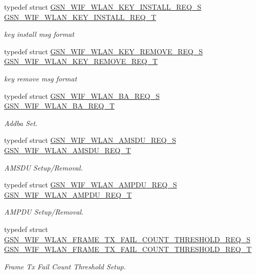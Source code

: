 \begin{DoxyCompactItemize}
typedef struct \hyperlink{a00386}{GSN\_\-WIF\_\-WLAN\_\-KEY\_\-INSTALL\_\-REQ\_\-S} \hyperlink{a00677_gaf02b17f4ae1181f48eafc5cafc75a98b}{GSN\_\-WIF\_\-WLAN\_\-KEY\_\-INSTALL\_\-REQ\_\-T}
\begin{DoxyCompactList}\small\item\em key install msg format \end{DoxyCompactList}\item 
typedef struct \hyperlink{a00387}{GSN\_\-WIF\_\-WLAN\_\-KEY\_\-REMOVE\_\-REQ\_\-S} \hyperlink{a00677_gab7781e4db5d81b8372ab59ea540b6f04}{GSN\_\-WIF\_\-WLAN\_\-KEY\_\-REMOVE\_\-REQ\_\-T}
\begin{DoxyCompactList}\small\item\em key remove msg format \end{DoxyCompactList}\item 
typedef struct \hyperlink{a00370}{GSN\_\-WIF\_\-WLAN\_\-BA\_\-REQ\_\-S} \hyperlink{a00677_ga9c1f7a4f3662503ec5a924804653ae43}{GSN\_\-WIF\_\-WLAN\_\-BA\_\-REQ\_\-T}
\begin{DoxyCompactList}\small\item\em Addba Set. \end{DoxyCompactList}\item 
typedef struct \hyperlink{a00367}{GSN\_\-WIF\_\-WLAN\_\-AMSDU\_\-REQ\_\-S} \hyperlink{a00677_ga3da66319027a0addea57f579e40c55a6}{GSN\_\-WIF\_\-WLAN\_\-AMSDU\_\-REQ\_\-T}
\begin{DoxyCompactList}\small\item\em AMSDU Setup/Removal. \end{DoxyCompactList}\item 
typedef struct \hyperlink{a00366}{GSN\_\-WIF\_\-WLAN\_\-AMPDU\_\-REQ\_\-S} \hyperlink{a00677_gade98eca1b34b9be5633f39a09c50f1d1}{GSN\_\-WIF\_\-WLAN\_\-AMPDU\_\-REQ\_\-T}
\begin{DoxyCompactList}\small\item\em AMPDU Setup/Removal. \end{DoxyCompactList}\item 
typedef struct \hyperlink{a00381}{GSN\_\-WIF\_\-WLAN\_\-FRAME\_\-TX\_\-FAIL\_\-COUNT\_\-THRESHOLD\_\-REQ\_\-S} \hyperlink{a00677_ga004bcfaf3fdb9825409e0ae35e69a636}{GSN\_\-WIF\_\-WLAN\_\-FRAME\_\-TX\_\-FAIL\_\-COUNT\_\-THRESHOLD\_\-REQ\_\-T}
\begin{DoxyCompactList}\small\item\em Frame Tx Fail Count Threshold Setup. \end{DoxyCompactList}\item 

\end{DoxyCompactItemize}
